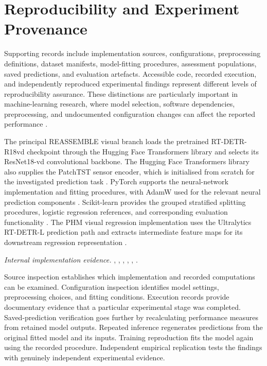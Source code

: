 \section{Reproducibility and Experiment Provenance}
\label{sec:ch4-reproducibility}

Supporting records include implementation sources, configurations, preprocessing definitions, dataset manifests, model-fitting procedures, assessment populations, saved predictions, and evaluation artefacts. Accessible code, recorded execution, and independently reproduced experimental findings represent different levels of reproducibility assurance. These distinctions are particularly important in machine-learning research, where model selection, software dependencies, preprocessing, and undocumented configuration changes can affect the reported performance \parencite{P009}.

The principal REASSEMBLE visual branch loads the pretrained RT-DETR-R18vd checkpoint through the Hugging Face Transformers library and selects its ResNet18-vd convolutional backbone. The Hugging Face Transformers library also supplies the PatchTST sensor encoder, which is initialised from scratch for the investigated prediction task \parencite{Wolf2020Transformers}. PyTorch supports the neural-network implementation and fitting procedures, with AdamW used for the relevant neural prediction components \parencite{Paszke2019PyTorch}. Scikit-learn provides the grouped stratified splitting procedures, logistic regression references, and corresponding evaluation functionality \parencite{Pedregosa2011ScikitLearn}. The PHM visual regression implementation uses the Ultralytics RT-DETR-L prediction path and extracts intermediate feature maps for its downstream regression representation \parencite{UltralyticsRTDETR}.

\noindent\textit{Internal implementation evidence.} , , , , , .

Source inspection establishes which implementation and recorded computations can be examined. Configuration inspection identifies model settings, preprocessing choices, and fitting conditions. Execution records provide documentary evidence that a particular experimental stage was completed. Saved-prediction verification goes further by recalculating performance measures from retained model outputs. Repeated inference regenerates predictions from the original fitted model and its inputs. Training reproduction fits the model again using the recorded procedure. Independent empirical replication tests the findings with genuinely independent experimental evidence.


